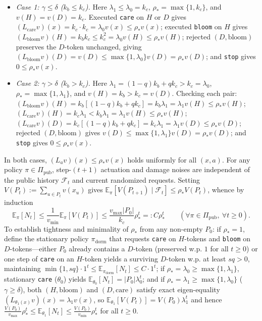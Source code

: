 \documentclass[11pt,a4paper]{article}
\providecommand{\tightlist}{\setlength{\itemsep}{2pt}\setlength{\parskip}{0pt}}
\begin{document}
\begin{itemize}
\tightlist
\item
  \emph{Case 1: \(\gamma \le \delta\) (\(k_b \le k_c\)).} Here
  \(\lambda_1 \le \lambda_0 = k_c\), \(\rho_* = \max\{1, k_c\}\), and
  \(v(H) = v(D) = k_c\). Executed \texttt{care} on \(H\) or \(D\) gives
  \((L_{\mathrm{care}} v)(x) = k_c \cdot k_c = \lambda_0 v(x) \le \rho_* v(x)\);
  executed \texttt{bloom} on \(H\) gives
  \((L_{\mathrm{bloom}} v)(H) = k_b k_c \le k_c^2 = \lambda_0 v(H) \le \rho_* v(H)\);
  rejected \((D, \mathrm{bloom})\) preserves the \(D\)-token unchanged,
  giving
  \((L_{\mathrm{bloom}} v)(D) = v(D) \le \max\{1, \lambda_0\} v(D) = \rho_* v(D)\);
  and \texttt{stop} gives \(0 \le \rho_* v(x)\).
\item
  \emph{Case 2: \(\gamma > \delta\) (\(k_b > k_c\)).} Here
  \(\lambda_1 = (1-q)k_b + q k_c > k_c = \lambda_0\),
  \(\rho_* = \max\{1, \lambda_1\}\), and \(v(H) = k_b > k_c = v(D)\).
  Checking each pair:
  \((L_{\mathrm{bloom}} v)(H) = k_b[(1-q)k_b + q k_c] = k_b \lambda_1 = \lambda_1 v(H) \le \rho_* v(H)\);
  \((L_{\mathrm{care}} v)(H) = k_c \lambda_1 < k_b \lambda_1 = \lambda_1 v(H) \le \rho_* v(H)\);
  \((L_{\mathrm{care}} v)(D) = k_c[(1-q)k_b + q k_c] = k_c \lambda_1 = \lambda_1 v(D) \le \rho_* v(D)\);
  rejected \((D, \mathrm{bloom})\) gives
  \(v(D) \le \max\{1, \lambda_1\} v(D) = \rho_* v(D)\); and
  \texttt{stop} gives \(0 \le \rho_* v(x)\).
\end{itemize}

In both cases, \((L_a v)(x) \le \rho_* v(x)\) holds uniformly for all
\((x,a)\). For any policy \(\pi \in \Pi_{\mathrm{pub}}\), step-\((t+1)\)
actuation and damage noises are independent of the public history
\(\mathcal{F}_t\) and current randomized requests. Setting
\(V(P_t) := \sum_{u \in P_t} v(x_u)\) gives
\(\mathbb{E}_\pi[V(P_{t+1}) \mid \mathcal{F}_t] \le \rho_* V(P_t)\),
whence by induction
\[\mathbb{E}_\pi[N_t] \le \frac{1}{v_{\min}} \mathbb{E}_\pi[V(P_t)] \le \frac{v_{\max} |P_0|}{k_c} \rho_*^t =: C \rho_*^t \qquad (\forall \pi \in \Pi_{\mathrm{pub}},\ \forall t \ge 0).\]
To establish tightness and minimality of \(\rho_*\) from any non-empty
\(P_0\): if \(\rho_* = 1\), define the stationary policy
\(\pi_{\mathrm{dorm}}\) that requests \texttt{care} on \(H\)-tokens and
\texttt{bloom} on \(D\)-tokens---either \(P_0\) already contains a
\(D\)-token (preserved w.p. \(1\) for all \(t \ge 0\)) or one step of
\texttt{care} on an \(H\)-token yields a surviving \(D\)-token w.p. at
least \(s q > 0\), maintaining
\(\min\{1, s q\}\cdot 1^t \le \mathbb{E}_{\pi_{\mathrm{dorm}}}[N_t] \le C \cdot 1^t\);
if \(\rho_* = \lambda_0 \ge \max\{1, \lambda_1\}\), stationary
\texttt{care} (\(\theta_0\)) yields
\(\mathbb{E}_{\theta_0}[N_t] = |P_0| \lambda_0^t\); and if
\(\rho_* = \lambda_1 \ge \max\{1, \lambda_0\}\) (\(\gamma \ge \delta\)),
both \((H, \mathrm{bloom})\) and \((D, \mathrm{care})\) satisfy exact
eigen-equality \((L_{\theta_1(x)} v)(x) = \lambda_1 v(x)\), so
\(\mathbb{E}_{\theta_1}[V(P_t)] = V(P_0) \lambda_1^t\) and hence
\(\frac{V(P_0)}{v_{\max}} \rho_*^t \le \mathbb{E}_{\theta_1}[N_t] \le \frac{V(P_0)}{v_{\min}} \rho_*^t\)
for all \(t \ge 0\).
\end{document}
